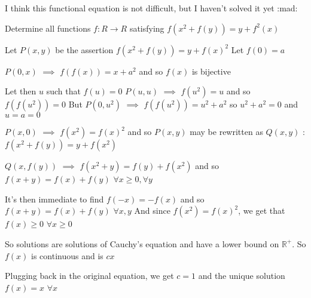 \begin{solution}
	\begin{tcolorbox}I think this functional equation is not difficult, but I haven't solved it yet  :mad: 

\begin{italicized}Determine all functions $ f: R \rightarrow R$ satisfying
$ f(x^2 + f(y)) = y + f^2(x)$\end{italicized}\end{tcolorbox}

Let $ P(x,y)$ be the assertion $ f(x^2+f(y))=y+f(x)^2$
Let $ f(0)=a$

$ P(0,x)$ $ \implies$ $ f(f(x))=x+a^2$ and so $ f(x)$ is bijective

Let then $ u$ such that $ f(u)=0$
$ P(u,u)$ $ \implies$ $ f(u^2)=u$ and so $ f(f(u^2))=0$ But $ P(0,u^2)$ $ \implies$ $ f(f(u^2))=u^2+a^2$ so $ u^2+a^2=0$ and $ u=a=0$

$ P(x,0)$ $ \implies$ $ f(x^2)=f(x)^2$ and so $ P(x,y)$ may be rewritten as $ Q(x,y)$ : $ f(x^2+f(y))=y+f(x^2)$

$ Q(x,f(y))$ $ \implies$ $ f(x^2+y)=f(y)+f(x^2)$ and so $ f(x+y)=f(x)+f(y)$ $ \forall x\ge 0,\forall y$

It's then immediate to find $ f(-x)=-f(x)$ and so $ f(x+y)=f(x)+f(y)$ $ \forall x,y$
And since $ f(x^2)=f(x)^2$, we get that $ f(x)\ge 0$ $ \forall x\ge 0$ 

So solutions are solutions of Cauchy's equation and have a lower bound on $ \mathbb R^+$. So $ f(x)$ is continuous and is $ cx$

Plugging back in the original equation, we get $ c=1$ and the unique solution $ \boxed{f(x)=x}$ $ \forall x$
\end{solution}



